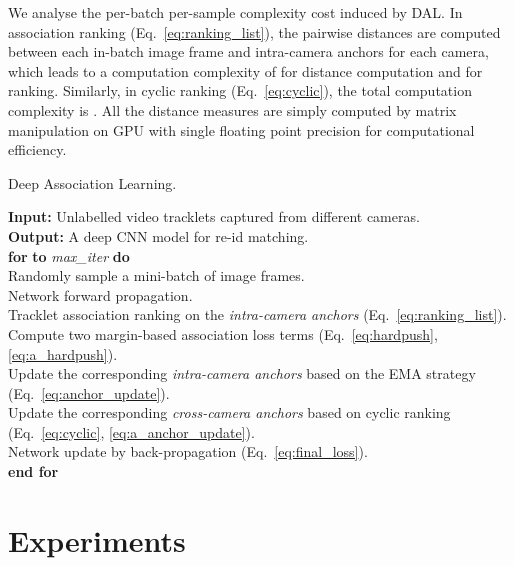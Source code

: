 \documentclass{bmvc2k}
\begin{document}
\vspace{0.1em}
We analyse the per-batch per-sample complexity cost induced by DAL.
In association ranking (Eq.~\eqref{eq:ranking_list}), the pairwise distances are computed between each in-batch image frame and  {intra-camera anchors} for each camera, which leads to a computation complexity of 
 for distance computation
and  for ranking. Similarly, in cyclic ranking (Eq.~\eqref{eq:cyclic}), the total 
computation complexity is . 
All the distance measures are simply computed 
by matrix manipulation on GPU with single floating point precision 
for computational efficiency.\vspace{-0.2cm}
\begin{algorithm}[h]
	\caption{\normalsize Deep Association Learning.} \label{Algorithm}
	{
	\textbf{Input:} Unlabelled video tracklets captured from different cameras. \\
	\textbf{Output:} A deep CNN model for re-id matching. \\
	\textbf{for}  \textbf{to}  \textsl{max\_iter} \textbf{do} \\ 
		\hphantom{~~~~~~}  
		Randomly sample a mini-batch of image frames. \\
		\hphantom{~~~~~~} 
		Network forward propagation.\\
		\hphantom{~~~~~~} 
		Tracklet association ranking on the {\em intra-camera anchors} (Eq.~\eqref{eq:ranking_list}). \\
		\hphantom{~~~~~~} 
		Compute two margin-based association loss terms (Eq.~\eqref{eq:hardpush}, \eqref{eq:a_hardpush}). \\
		\hphantom{~~~~~~} 
		Update the corresponding {\em intra-camera anchors} based on the EMA strategy  (Eq.~\eqref{eq:anchor_update}). \\
		\hphantom{~~~~~~} 
		Update the corresponding {\em cross-camera anchors} based on cyclic ranking (Eq.~\eqref{eq:cyclic}, \eqref{eq:a_anchor_update}). \\
		\hphantom{~~~~~~} 
		Network update by back-propagation (Eq.~\eqref{eq:final_loss}). \\
	\textbf{end for}} \end{algorithm}

\vspace{-0.5cm}
\section{Experiments}
\vspace{-0.1cm}
\end{document}
